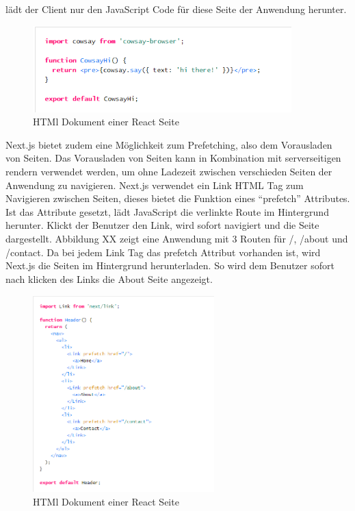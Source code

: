 \documentclass[runningheads]{llncs}
\begin{document}
lädt der Client nur den JavaScript Code für diese Seite der Anwendung herunter.
\begin{figure}
  \centering
  \includegraphics[width=10cm]{images/CodeSplitting}
  \caption{HTMl Dokument einer React Seite}
\end{figure}
Next.js bietet zudem eine Möglichkeit zum Prefetching, 
also dem Vorausladen von Seiten. 
Das Vorausladen von Seiten kann in Kombination mit serverseitigen rendern verwendet werden, 
um ohne Ladezeit zwischen verschieden Seiten der Anwendung zu navigieren. 
Next.js verwendet ein Link HTML Tag zum Navigieren zwischen Seiten, 
dieses bietet die Funktion eines “prefetch” Attributes. 
Ist das Attribute gesetzt, 
lädt JavaScript die verlinkte Route im Hintergrund herunter. 
Klickt der Benutzer den Link, 
wird sofort navigiert und die Seite dargestellt. 
Abbildung XX zeigt eine Anwendung mit 3 Routen für /, /about und /contact. 
Da bei jedem Link Tag das prefetch Attribut vorhanden ist, 
wird Next.js die Seiten im Hintergrund herunterladen. 
So wird dem Benutzer sofort nach klicken des Links die About Seite angezeigt.
\begin{figure}
  \centering
  \includegraphics[width=7cm]{images/prefetchnext}
  \caption{HTMl Dokument einer React Seite}
\end{figure}
\end{document}
